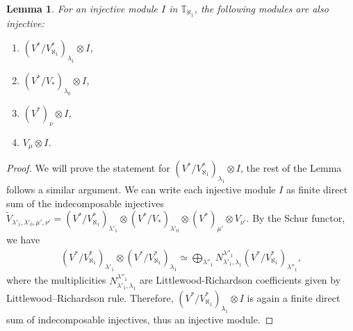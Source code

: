 \documentclass[openany, a4paper]{amsbook}
\newtheorem{lem}[thm]{Lemma}
\newtheorem{prop}[thm]{Proposition}
\theoremstyle{definition}
\numberwithin{equation}{chapter}
\newcommand{\T}[1]{{\mathbb{T}}_{\aleph_{#1}}}
\begin{document}
\begin{lem}\label{injective}
    For an injective module $I$ in $\T{1}$, the following modules are also injective:
    \begin{enumerate}
        \item $(V^\ast/V^\ast_{\aleph_1})_{\lambda_1} \otimes I$,
        \item $(V^\ast/V_\ast)_{\lambda_0}\otimes I$,
        \item  $(V^\ast)_{\nu} \otimes I$,
        \item  $V_\mu \otimes I$.
    \end{enumerate}
\end{lem}
\begin{proof}
    We will prove the statement for $(V^\ast/V^\ast_{\aleph_1})_{\lambda_1} \otimes I$, the rest of the Lemma follows a similar argument. We can write each injective module $I$ as finite direct sum of the indecomposable injectives $\tilde{V}_{\lambda'_1, \lambda'_0, \mu', \nu'} = (V^\ast/V^\ast_{\aleph_1})_{\lambda'_1} \otimes (V^\ast/V_\ast)_{\lambda'_0} \otimes (V^\ast)_{\mu'} \otimes V_{\nu'}$. By the Schur functor, we have
    \begin{align}
        (V^\ast/V^\ast_{\aleph_1})_{\lambda'_1} \otimes (V^\ast/V^\ast_{\aleph_1})_{\lambda_1} \simeq \bigoplus_{\lambda''_1} N^{\lambda''_1}_{\lambda'_1, \lambda_1} (V^\ast/V^\ast_{\aleph_1})_{\lambda''_1},
    \end{align}
    where the multiplicities $N^{\lambda''_1}_{\lambda'_1, \lambda_1}$ are Littlewood-Richardson coefficients given by Littlewood–Richardson rule. Therefore, $(V^\ast/V^\ast_{\aleph_1})_{\lambda_1} \otimes I$ is again a finite direct sum of indecomposable injectives, thus an injective module. 
\end{proof}

\end{document}
